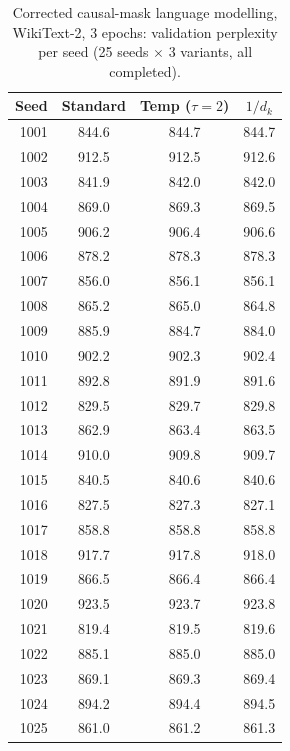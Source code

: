 \documentclass[10pt,a4paper]{article}
\newcommand{\dk}{d_k}
\begin{document}
\begin{table}[H]
  \centering
  \caption{Corrected causal-mask language modelling, WikiText-2, 3 epochs:
  validation perplexity per seed (25 seeds $\times$ 3 variants, all completed).}
  \small
  \begin{tabular}{r c c c}
    \toprule
    \textbf{Seed} & \textbf{Standard} & \textbf{Temp ($\tau=2$)} & \textbf{$1/\dk$} \\
    \midrule
1001 & 844.6 & 844.7 & 844.7 \\
1002 & 912.5 & 912.5 & 912.6 \\
1003 & 841.9 & 842.0 & 842.0 \\
1004 & 869.0 & 869.3 & 869.5 \\
1005 & 906.2 & 906.4 & 906.6 \\
1006 & 878.2 & 878.3 & 878.3 \\
1007 & 856.0 & 856.1 & 856.1 \\
1008 & 865.2 & 865.0 & 864.8 \\
1009 & 885.9 & 884.7 & 884.0 \\
1010 & 902.2 & 902.3 & 902.4 \\
1011 & 892.8 & 891.9 & 891.6 \\
1012 & 829.5 & 829.7 & 829.8 \\
1013 & 862.9 & 863.4 & 863.5 \\
1014 & 910.0 & 909.8 & 909.7 \\
1015 & 840.5 & 840.6 & 840.6 \\
1016 & 827.5 & 827.3 & 827.1 \\
1017 & 858.8 & 858.8 & 858.8 \\
1018 & 917.7 & 917.8 & 918.0 \\
1019 & 866.5 & 866.4 & 866.4 \\
1020 & 923.5 & 923.7 & 923.8 \\
1021 & 819.4 & 819.5 & 819.6 \\
1022 & 885.1 & 885.0 & 885.0 \\
1023 & 869.1 & 869.3 & 869.4 \\
1024 & 894.2 & 894.4 & 894.5 \\
1025 & 861.0 & 861.2 & 861.3 \\
    \bottomrule
  \end{tabular}
\end{table}
\end{document}
